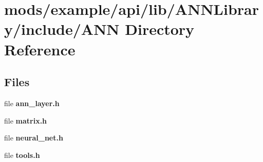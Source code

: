 \section{mods/example/api/lib/\+A\+N\+N\+Library/include/\+A\+N\+N Directory Reference}
\label{dir_f6abb283e75ebac164b6eaebb60ddb46}
\subsection*{Files}
\begin{DoxyCompactItemize}
\item 
file {\bfseries ann\+\_\+layer.\+h}
\item 
file {\bfseries matrix.\+h}
\item 
file {\bfseries neural\+\_\+net.\+h}
\item 
file {\bfseries tools.\+h}
\end{DoxyCompactItemize}
